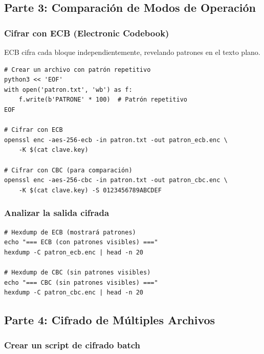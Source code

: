 \documentclass[11pt,a4paper]{article}
\begin{document}
\subsection{Parte 3: Comparación de Modos de Operación}

\subsubsection{Cifrar con ECB (Electronic Codebook)}

ECB cifra cada bloque independientemente, revelando patrones en el texto plano.

\begin{lstlisting}[caption={Cifrado con ECB}]
# Crear un archivo con patrón repetitivo
python3 << 'EOF'
with open('patron.txt', 'wb') as f:
    f.write(b'PATRONE' * 100)  # Patrón repetitivo
EOF

# Cifrar con ECB
openssl enc -aes-256-ecb -in patron.txt -out patron_ecb.enc \
    -K $(cat clave.key)

# Cifrar con CBC (para comparación)
openssl enc -aes-256-cbc -in patron.txt -out patron_cbc.enc \
    -K $(cat clave.key) -S 0123456789ABCDEF
\end{lstlisting}

\subsubsection{Analizar la salida cifrada}

\begin{lstlisting}[caption={Análisis visual de patrones}]
# Hexdump de ECB (mostrará patrones)
echo "=== ECB (con patrones visibles) ==="
hexdump -C patron_ecb.enc | head -n 20

# Hexdump de CBC (sin patrones visibles)
echo "=== CBC (sin patrones visibles) ==="
hexdump -C patron_cbc.enc | head -n 20
\end{lstlisting}

\subsection{Parte 4: Cifrado de Múltiples Archivos}

\subsubsection{Crear un script de cifrado batch}
\end{document}
